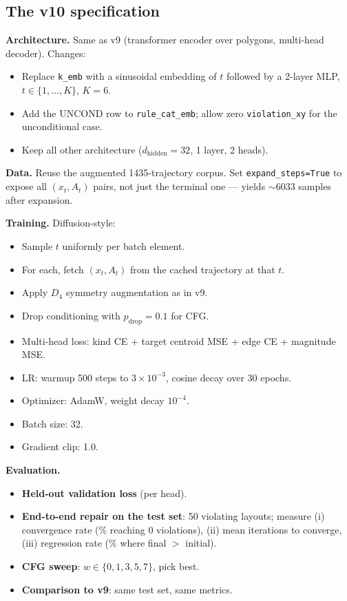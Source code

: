 \documentclass[11pt,a4paper]{article}
\begin{document}
\subsection{The v10 specification}

\textbf{Architecture.} Same as v9 (transformer encoder over polygons,
multi-head decoder). Changes:
\begin{itemize}[leftmargin=*]
\item Replace \verb|k_emb| with a sinusoidal embedding of $t$ followed by
  a 2-layer MLP, $t \in \{1, \ldots, K\}$, $K = 6$.
\item Add the UNCOND row to \verb|rule_cat_emb|; allow zero
  \verb|violation_xy| for the unconditional case.
\item Keep all other architecture ($d_\text{hidden} = 32$, 1 layer, 2 heads).
\end{itemize}

\textbf{Data.} Reuse the augmented 1435-trajectory corpus. Set
\verb|expand_steps=True| to expose all $(x_t, A_t)$ pairs, not just the
terminal one --- yields $\sim$6033 samples after expansion.

\textbf{Training.} Diffusion-style:
\begin{itemize}[leftmargin=*]
\item Sample $t$ uniformly per batch element.
\item For each, fetch $(x_t, A_t)$ from the cached trajectory at that $t$.
\item Apply $D_4$ symmetry augmentation as in v9.
\item Drop conditioning with $p_\text{drop} = 0.1$ for CFG.
\item Multi-head loss: kind CE + target centroid MSE + edge CE + magnitude MSE.
\item LR: warmup 500 steps to $3\!\times\!10^{-3}$, cosine decay over 30 epochs.
\item Optimizer: AdamW, weight decay $10^{-4}$.
\item Batch size: 32.
\item Gradient clip: 1.0.
\end{itemize}

\textbf{Evaluation.}
\begin{itemize}[leftmargin=*]
\item \textbf{Held-out validation loss} (per head).
\item \textbf{End-to-end repair on the test set}: 50 violating layouts;
  measure (i) convergence rate (\% reaching 0 violations), (ii) mean
  iterations to converge, (iii) regression rate (\% where final $>$ initial).
\item \textbf{CFG sweep}: $w \in \{0, 1, 3, 5, 7\}$, pick best.
\item \textbf{Comparison to v9}: same test set, same metrics.
\end{itemize}
\end{document}
